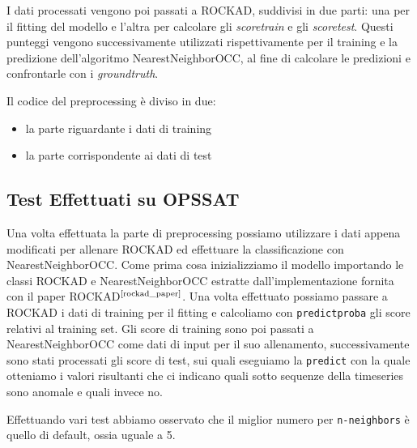 I dati processati vengono poi passati a ROCKAD, suddivisi in due parti: una per il fitting del modello e l'altra per calcolare gli \textit{score\textunderscore train} e gli \textit{score\textunderscore test}. Questi punteggi vengono successivamente utilizzati rispettivamente per il training e la predizione dell'algoritmo NearestNeighborOCC, al fine di calcolare le predizioni e confrontarle con i \textit{ground\textunderscore truth}.


Il codice del preprocessing è diviso in due: 

\begin{itemize}
    \item la parte riguardante i dati di training

\end{itemize}

\begin{itemize}
    \item la parte corrispondente ai dati di test
\end{itemize}




\subsection{Test Effettuati su OPS\textunderscore SAT}
Una volta effettuata la parte di preprocessing possiamo utilizzare i dati appena modificati per allenare ROCKAD ed effettuare la classificazione con NearestNeighborOCC.
Come prima cosa inizializziamo il modello importando le classi ROCKAD e NearestNeighborOCC estratte dall'implementazione fornita con il paper ROCKAD$^{\text{\cite{rockad_paper}}}$.
Una volta effettuato possiamo passare a ROCKAD i dati di training per il fitting e calcoliamo con \texttt{predict\textunderscore proba} gli score relativi al training set.
Gli score di training sono poi passati a NearestNeighborOCC come dati di input per il suo allenamento, successivamente sono stati processati gli score di test, sui quali eseguiamo la \texttt{predict} con la quale otteniamo i valori risultanti che ci indicano quali sotto sequenze della timeseries sono anomale e quali invece no.

Effettuando vari test abbiamo osservato che il miglior numero per \texttt{n-neighbors} è quello di default, ossia uguale a 5.

